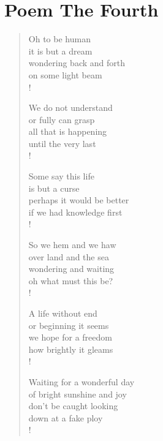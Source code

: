 \section{Poem The Fourth}

\settowidth{\versewidth}{Than Tycho Brahe, or Erra Pater:}
\begin{verse}
Oh to be human\\
it is but a dream\\
wondering back and forth\\
on some light beam\\!

We do not understand\\
or fully can grasp\\
all that is happening\\
until the very last\\!

Some say this life\\
is but a curse\\
perhaps it would be better\\
if we had knowledge first\\!

So we hem and we haw\\
over land and the sea\\
wondering and waiting\\
oh what must this be?\\!

A life without end\\
or beginning it seems\\
we hope for a freedom\\
how brightly it gleams\\!

Waiting for a wonderful day\\
of bright sunshine and joy\\
don't be caught looking\\
down at a fake ploy\\!
\end{verse}
